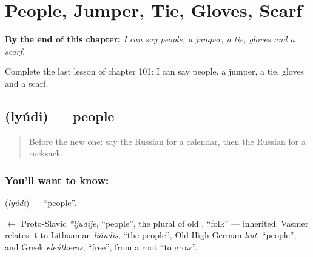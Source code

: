 
\chapter{People, Jumper, Tie, Gloves, Scarf}
\label{ch:ru-people-jumper-tie-gloves-scarf}

\begin{chapteropening}
\textbf{By the end of this chapter:} \emph{I can say people, a jumper, a tie, gloves and a scarf.}

Complete the last lesson of chapter 101: I can say people, a jumper, a tie, gloves and a scarf.
\end{chapteropening}

\section[\texorpdfstring{\ru{люди} (lyúdi)}{люди (lyúdi)}]{ (lyúdi) — people}

\label{lesson:RU-C101-people}



\begin{quote}
Before the new one: say the Russian for a calendar, then the Russian for a rucksack.
\end{quote}

\subsection*{You'll want to know: }
\textbf{} (\emph{lyúdi}) — \textquotedblleft{}people\textquotedblright{}.

\begin{cousinweb}
\textbf{} $\leftarrow$ Proto-Slavic \emph{*ljudĭje}, \textquotedblleft{}people\textquotedblright{}, the plural of old \emph{}, \textquotedblleft{}folk\textquotedblright{} — inherited. Vasmer relates it to Lithuanian \emph{liáudis}, \textquotedblleft{}the people\textquotedblright{}, Old High German \emph{liut}, \textquotedblleft{}people\textquotedblright{}, and Greek \emph{eleútheros}, \textquotedblleft{}free\textquotedblright{}, from a root \textquotedblleft{}to grow\textquotedblright{}.
\end{cousinweb}

